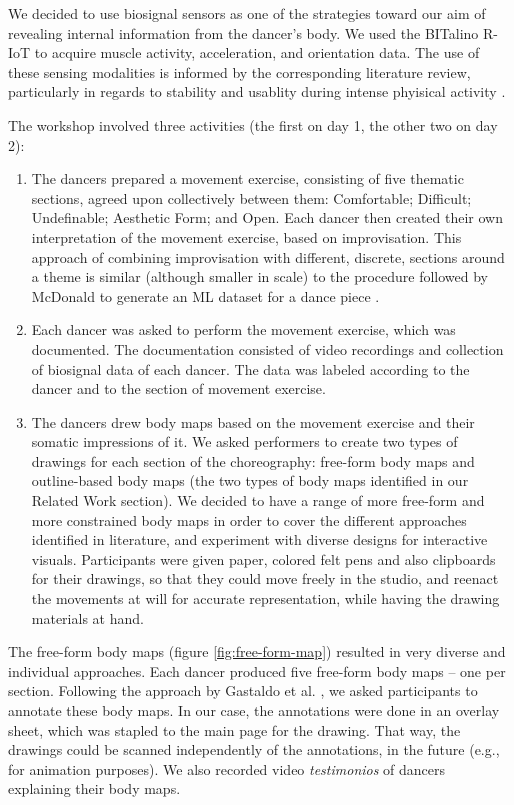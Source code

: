 We decided to use biosignal sensors as one of the strategies toward our aim of revealing internal information from the dancer’s body. We used the BITalino R-IoT to acquire muscle activity, acceleration, and orientation data. The use of these sensing modalities is informed by the corresponding literature review, particularly in regards to stability and usablity during intense phyisical activity \cite{aly_appropriating_2021}.

The workshop involved three activities (the first on day 1, the other two on day 2):
\begin{enumerate}
    \item  The dancers prepared a movement exercise, consisting of five thematic sections, agreed upon collectively between them: Comfortable; Difficult; Undefinable; Aesthetic Form; and Open. Each dancer then created their own interpretation of the movement exercise, based on improvisation. This approach of combining improvisation with different, discrete, sections around a theme is similar (although smaller in scale) to the procedure followed by McDonald to generate an ML dataset for a dance piece \cite{mcdonald_dance_2018}.
    \item Each dancer was asked to perform the movement exercise, which was documented. The documentation consisted of video recordings and collection of biosignal data of each dancer. The data was labeled according to the dancer and to the section of movement exercise.
    \item The dancers drew body maps based on the movement exercise and their somatic impressions of it. We asked performers to create two types of drawings for each section of the choreography: free-form body maps and outline-based body maps (the two types of body maps identified in our Related Work section). We decided to have a range of more free-form and more constrained body maps in order to cover the different approaches identified in literature, and experiment with diverse designs for interactive visuals. Participants were given paper, colored felt pens and also clipboards for their drawings, so that they could move freely in the studio, and reenact the movements at will for accurate representation, while having the drawing materials at hand.
\end{enumerate}

The free-form body maps (figure \ref{fig:free-form-map}) resulted in very diverse and individual approaches. Each dancer produced five free-form body maps -- one per section. Following the approach by Gastaldo et al. \cite{gastaldo_body-map_2012}, we asked participants to annotate these body maps. In our case, the annotations were done in an overlay sheet, which was stapled to the main page for the drawing. That way, the drawings could be scanned independently of the annotations, in the future (e.g., for animation purposes). We also recorded video \textit{testimonios} of dancers explaining their body maps.

